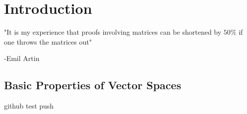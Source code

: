 \chapter{Introduction}\label{chapter:introduction}

\vspace{12pt}
"It is my experience that proofs involving matrices can be shortened by $50\%$ if one throws the matrices out"

\quad\quad\quad\quad\quad\quad\quad\quad\quad\quad\quad\quad\quad\quad\quad\quad\quad\quad\quad\quad\quad\quad\quad\quad\quad\quad\quad\quad\quad\quad\quad\quad\quad -Emil Artin
\section{Basic Properties of Vector Spaces}
    github test push 
